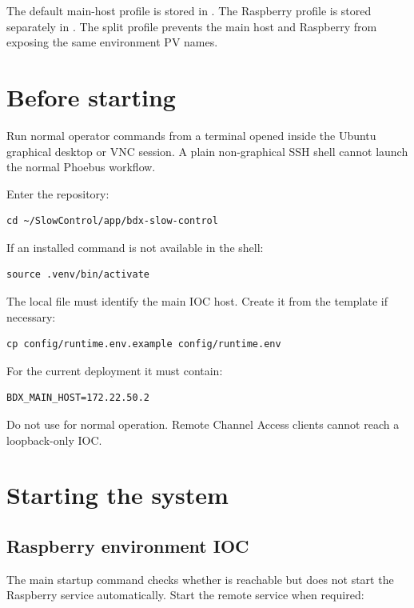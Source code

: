 The default main-host profile is stored in . The Raspberry profile is stored separately in . The split profile prevents the main host and Raspberry from exposing the same environment PV names.

\section{Before starting}

Run normal operator commands from a terminal opened inside the Ubuntu graphical desktop or VNC session. A plain non-graphical SSH shell cannot launch the normal Phoebus workflow.

Enter the repository:

\begin{lstlisting}[style=shell]
cd ~/SlowControl/app/bdx-slow-control
\end{lstlisting}

If an installed command is not available in the shell:

\begin{lstlisting}[style=shell]
source .venv/bin/activate
\end{lstlisting}

The local file  must identify the main IOC host. Create it from the template if necessary:

\begin{lstlisting}[style=shell]
cp config/runtime.env.example config/runtime.env
\end{lstlisting}

For the current deployment it must contain:

\begin{lstlisting}[style=shell]
BDX_MAIN_HOST=172.22.50.2
\end{lstlisting}

Do not use  for normal operation. Remote Channel Access clients cannot reach a loopback-only IOC.

\section{Starting the system}

\subsection{Raspberry environment IOC}

The main startup command checks whether  is reachable but does not start the Raspberry service automatically. Start the remote service when required:

